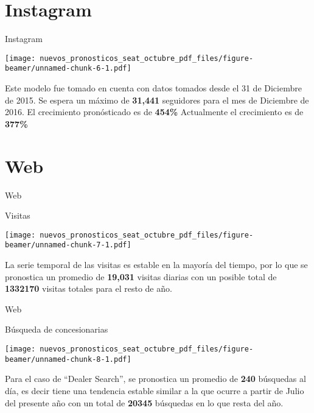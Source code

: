 \documentclass[ignorenonframetext,]{beamer}
\begin{document}
\section{Instagram}\label{instagram}

\begin{frame}{Instagram}

\texttt{[image: nuevos\_pronosticos\_seat\_octubre\_pdf\_files/figure-beamer/unnamed-chunk-6-1.pdf]}

Este modelo fue tomado en cuenta con datos tomados desde el 31 de
Diciembre de 2015. Se espera un máximo de \textbf{31,441} seguidores
para el mes de Diciembre de 2016. El crecimiento pronósticado es de
\textbf{454\%} Actualmente el crecimiento es de \textbf{377\%}

\end{frame}

\section{Web}\label{web}

\begin{frame}{Web}

\begin{block}{Visitas}

\texttt{[image: nuevos\_pronosticos\_seat\_octubre\_pdf\_files/figure-beamer/unnamed-chunk-7-1.pdf]}

La serie temporal de las visitas es estable en la mayoría del tiempo,
por lo que se pronostica un promedio de \textbf{19,031} visitas diarias
con un posible total de \textbf{1332170} visitas totales para el resto
de año.

\end{block}

\end{frame}

\begin{frame}{Web}

\begin{block}{Búsqueda de concesionarias}

\texttt{[image: nuevos\_pronosticos\_seat\_octubre\_pdf\_files/figure-beamer/unnamed-chunk-8-1.pdf]}

Para el caso de ``Dealer Search'', se pronostica un promedio de
\textbf{240} búsquedas al día, es decir tiene una tendencia estable
similar a la que ocurre a partir de Julio del presente año con un total
de \textbf{20345} búsquedas en lo que resta del año.

\end{block}

\end{frame}
\end{document}
